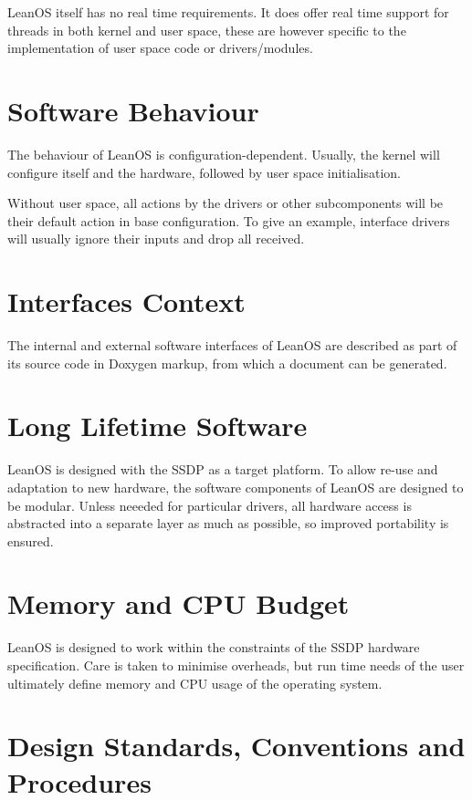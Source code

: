 LeanOS itself has no real time requirements. It does offer real time support for
threads in both kernel and user space, these are however specific to the
implementation of user space code or drivers/modules.

\section{Software Behaviour}

The behaviour of LeanOS is configuration-dependent. Usually, the kernel will
configure itself and the hardware, followed by user space initialisation.

Without user space, all actions by the drivers or other subcomponents will be
their default action in base configuration. To give an example, interface
drivers will usually ignore their inputs and drop all received.




\section{Interfaces Context}

The internal and external software interfaces of LeanOS are described as part
of its source code in Doxygen markup, from which a document can be generated.

\section{Long Lifetime Software}

LeanOS is designed with the \gls{SSDP} as a target platform. To allow re-use
and adaptation to new hardware, the software components of LeanOS are designed
to be modular. Unless neeeded for particular drivers, all hardware access is
abstracted into a separate layer as much as possible, so improved portability
is ensured.


\section{Memory and CPU Budget}

LeanOS is designed to work within the constraints of the \gls{SSDP} hardware
specification. Care is taken to minimise overheads, but run time needs of the
user ultimately define memory and CPU usage of the operating system.


\section{Design Standards, Conventions and Procedures}

